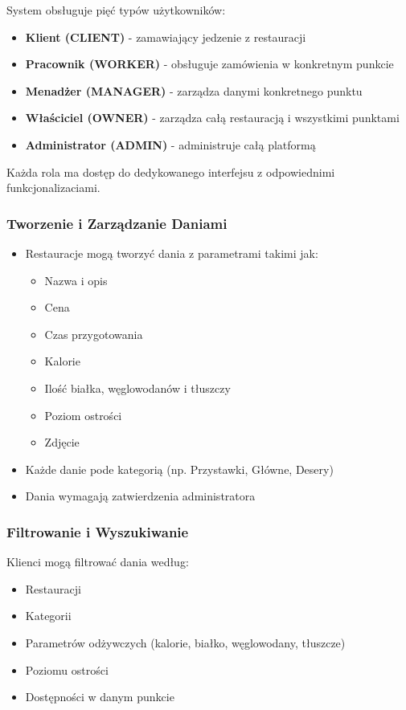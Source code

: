 ﻿\documentclass[12pt,a4paper,utf-8]{article}
\begin{document}
System obsługuje pięć typów użytkowników:
\begin{itemize}
    \item \textbf{Klient (CLIENT)} - zamawiający jedzenie z restauracji
    \item \textbf{Pracownik (WORKER)} - obsługuje zamówienia w konkretnym punkcie
    \item \textbf{Menadżer (MANAGER)} - zarządza danymi konkretnego punktu
    \item \textbf{Właściciel (OWNER)} - zarządza całą restauracją i wszystkimi punktami
    \item \textbf{Administrator (ADMIN)} - administruje całą platformą
\end{itemize}

Każda rola ma dostęp do dedykowanego interfejsu z odpowiednimi funkcjonalizaciami.

\subsubsection{Tworzenie i Zarządzanie Daniami}

\begin{itemize}
    \item Restauracje mogą tworzyć dania z parametrami takimi jak:
    \begin{itemize}
        \item Nazwa i opis
        \item Cena
        \item Czas przygotowania
        \item Kalorie
        \item Ilość białka, węglowodanów i tłuszczy
        \item Poziom ostrości
        \item Zdjęcie
    \end{itemize}
    \item Każde danie pode kategorią (np. Przystawki, Główne, Desery)
    \item Dania wymagają zatwierdzenia administratora
\end{itemize}

\subsubsection{Filtrowanie i Wyszukiwanie}

Klienci mogą filtrować dania według:
\begin{itemize}
    \item Restauracji
    \item Kategorii
    \item Parametrów odżywczych (kalorie, białko, węglowodany, tłuszcze)
    \item Poziomu ostrości
    \item Dostępności w danym punkcie
\end{itemize}
\end{document}
